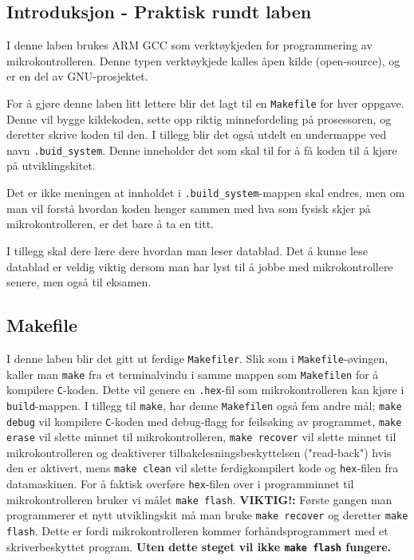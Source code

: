 \begin{alphasection}
\section{Introduksjon - Praktisk rundt laben}


I denne laben brukes ARM GCC som verktøykjeden for programmering av mikrokontrolleren. Denne typen verktøykjede kalles åpen kilde (open-source), og er en del av GNU-prosjektet.

For å gjøre denne laben litt lettere blir det lagt til en \verb|Makefile| for hver oppgave. Denne vil bygge kildekoden, sette opp riktig minnefordeling på prosessoren, og deretter skrive koden til den. I tillegg blir det også utdelt en undermappe ved navn \verb|.buid_system|. Denne inneholder det som skal til for å få koden til å kjøre på utviklingskitet. 

Det er ikke meningen at innholdet i \verb|.build_system|-mappen skal endres, men om man vil forstå hvordan koden henger sammen med hva som fysisk skjer på mikrokontrolleren, er det bare å ta en titt.

I tillegg skal dere lære dere hvordan man leser datablad. Det å kunne lese datablad er veldig viktig dersom man har lyst til å jobbe med mikrokontrollere senere, men også til eksamen.

\subsection{Makefile}

I denne laben blir det gitt ut ferdige \verb|Makefiler|. Slik som i \verb|Makefile|-øvingen, kaller man \verb|make| fra et terminalvindu i samme mappen som \verb|Makefilen| for å kompilere \verb|C|-koden. Dette vil genere en \verb|.hex|-fil som mikrokontrolleren kan kjøre i \verb|build|-mappen. I tillegg til \verb|make|, har denne \verb|Makefilen| også fem andre mål; \verb|make debug| vil kompilere \verb|C|-koden med debug-flagg for feilsøking av programmet, \verb|make erase| vil slette minnet til mikrokontrolleren, \verb|make recover| vil slette minnet til mikrokontrolleren og deaktiverer tilbakelesningsbeskyttelsen ("read-back") hvis den er aktivert, mens \verb|make clean| vil slette ferdigkompilert kode og \verb|hex|-filen fra datamaskinen. For å faktisk overføre \verb|hex|-filen over i programminnet til mikrokontrolleren bruker vi målet \verb|make flash|. {\bf{VIKTIG!:}} Første gangen man programmerer et nytt utviklingskit må man bruke \verb|make recover| og deretter \verb|make flash|. Dette er fordi mikrokontrolleren kommer forhåndsprogrammert med et skriverbeskyttet program. {\bf{Uten dette steget vil ikke \verb|make flash| fungere.}}


\end{alphasection}
